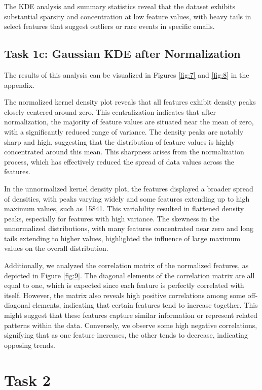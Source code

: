 \documentclass[a4paper,oneside,bibliography=totoc]{scrartcl}
\begin{document}
The KDE analysis and summary statistics reveal that the dataset exhibits substantial sparsity and concentration at low feature values, with heavy tails in select features that suggest outliers or rare events in specific emails. 

\subsection{Task 1c: Gaussian KDE after Normalization}
The results of this analysis can be visualized in Figures \ref{fig:7} and \ref{fig:8} in the appendix.

The normalized kernel density plot reveals that all features exhibit density peaks closely centered around zero. This centralization indicates that after normalization, the majority of feature values are situated near the mean of zero, with a significantly reduced range of variance. The density peaks are notably sharp and high, suggesting that the distribution of feature values is highly concentrated around this mean. This sharpness arises from the normalization process, which has effectively reduced the spread of data values across the features.

In the unnormalized kernel density plot, the features displayed a broader spread of densities, with peaks varying widely and some features extending up to high maximum values, such as 15841. This variability resulted in flattened density peaks, especially for features with high variance. The skewness in the unnormalized distributions, with many features concentrated near zero and long tails extending to higher values, highlighted the influence of large maximum values on the overall distribution.

Additionally, we analyzed the correlation matrix of the normalized features, as depicted in Figure \ref{fig:9}. The diagonal elements of the correlation matrix are all equal to one, which is expected since each feature is perfectly correlated with itself. However, the matrix also reveals high positive correlations among some off-diagonal elements, indicating that certain features tend to increase together. This might suggest that these features capture similar information or represent related patterns within the data. Conversely, we observe some high negative correlations, signifying that as one feature increases, the other tends to decrease, indicating opposing trends.




\section{Task 2}
\end{document}
